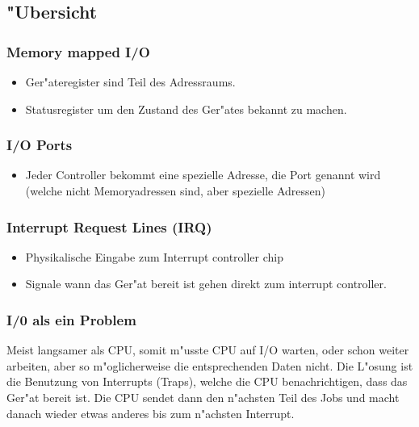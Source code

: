 \documentclass[german, 10pt, a4paper, twocolumn]{scrartcl}
\begin{document}
\subsection{"Ubersicht}

\subsubsection{Memory mapped I/O}

\begin{itemize}
	\item Ger"ateregister sind Teil des Adressraums.
	\item Statusregister um den Zustand des Ger"ates bekannt zu machen.
\end{itemize}

\subsubsection{I/O Ports}

\begin{itemize}
	\item Jeder Controller bekommt eine spezielle Adresse, die Port genannt wird (welche nicht Memoryadressen sind, aber spezielle Adressen)
\end{itemize}

\subsubsection{Interrupt Request Lines (IRQ)}

\begin{itemize}
	\item Physikalische Eingabe zum Interrupt controller chip
	\item Signale wann das Ger"at bereit ist gehen direkt zum interrupt controller.
\end{itemize}

\subsubsection{I/0 als ein Problem}

Meist langsamer als CPU, somit m"usste CPU auf I/O warten, oder schon weiter arbeiten, aber so m"oglicherweise die entsprechenden Daten nicht. Die L"osung ist die Benutzung von Interrupts (Traps), welche die CPU benachrichtigen, dass das Ger"at bereit ist. Die CPU sendet dann den n"achsten Teil des Jobs und macht danach wieder etwas anderes bis zum n"achsten Interrupt.\\
\end{document}
